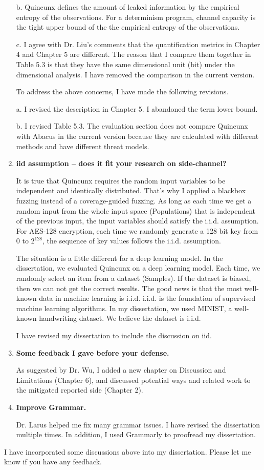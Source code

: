 \documentclass{article}
\begin{document}
\begin{enumerate}
b. Quincunx defines the amount of leaked information by the empirical entropy of the observations. For a determinism program, channel capacity is the tight upper bound of the the empirical entropy of the observations. 

c. I agree with Dr. Liu's comments that the quantification metrics in Chapter 4 and Chapter 5 are different. The reason that I compare them together in Table 5.3 is that they have the same dimensional unit (bit) under the dimensional analysis. I have removed the comparison in the current version.

To address the above concerns, I have made the following revisions.

a. I revised the description in Chapter 5. I abandoned the term lower bound.

b. I revised Table 5.3. The evaluation section does not compare Quincunx with Abacus in the current version because they are calculated with different methods and have different threat models.
\item \textbf{iid assumption – does it fit your research on side-channel?}

It is true that Quincunx requires the random input variables to be independent and identically distributed. That's why I applied a blackbox fuzzing instead of a coverage-guided fuzzing. As long as each time we get a random input from the whole input space (Populations) that is independent of the previous input, the input variables should satisfy the i.i.d. assumption. For AES-128 encryption, each time we randomly generate a 128 bit key from $0$ to $2^{128}$, the sequence of key values follows the i.i.d. assumption.

The situation is a little different for a deep learning model. In the dissertation, we evaluated Quincunx on a deep learning model. Each time, we randomly select an item from a dataset (Samples). If the dataset is biased, then we can not get the correct results. The good news is that the most well-known data in machine learning is i.i.d. i.i.d. is the foundation of supervised machine learning algorithms. In my dissertation, we used MINIST, a well-known handwriting dataset. We believe the dataset is i.i.d.

I have revised my dissertation to include the discussion on iid.


\item \textbf{Some feedback I gave before your defense.}

As suggested by Dr. Wu, I added a new chapter on Discussion and Limitations (Chapter 6), and discussed potential ways and related work to the mitigated reported side (Chapter 2).

\item \textbf{Improve Grammar.}

Dr. Larus helped me fix many grammar issues. I have revised the dissertation multiple times. In addition, I used Grammarly to proofread my dissertation.
\end{enumerate}

I have incorporated some discussions above into my dissertation. Please let me know if you have any feedback.
\end{document}
